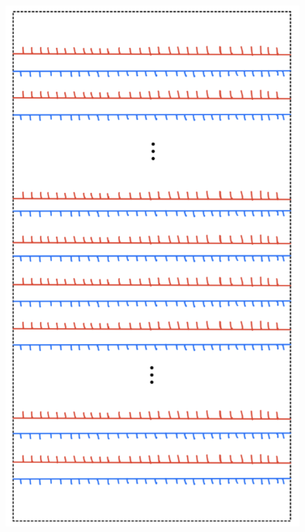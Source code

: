 \begin{figure}[H] 
    \centering
    \includegraphics[scale = 0.55]{diagrams/local_systems_on_as_diagrams/14.png} 
    \caption{}
    \label{fig:your-label}
\end{figure}

